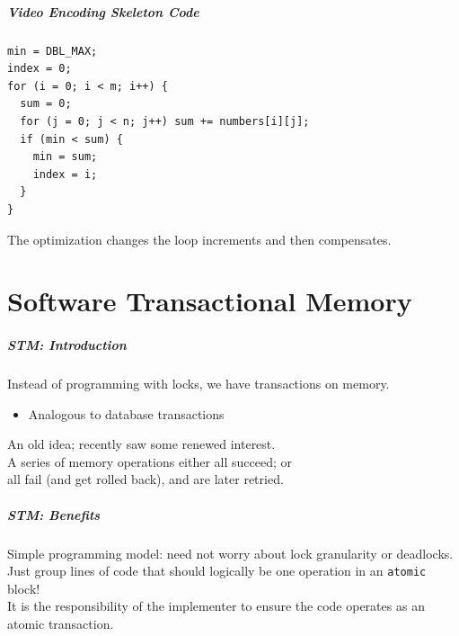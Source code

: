 \documentclass[aspectratio=43]{beamer}
\newenvironment{changemargin}[1]{%
  \begin{list}{}{%
    \setlength{\topsep}{0pt}%
    \setlength{\leftmargin}{#1}%
    \setlength{\rightmargin}{1em}
    \setlength{\listparindent}{\parindent}%
    \setlength{\itemindent}{\parindent}%
    \setlength{\parsep}{\parskip}%
  }%
  \item[]}{\end{list}}
\begin{document}

\begin{frame}[fragile]
  \frametitle{Video Encoding Skeleton Code}

\begin{changemargin}{2cm}
\begin{lstlisting}
min = DBL_MAX;
index = 0;
for (i = 0; i < m; i++) {
  sum = 0;
  for (j = 0; j < n; j++) sum += numbers[i][j];
  if (min < sum) {
    min = sum;
    index = i;
  }
}
\end{lstlisting}
The optimization changes the loop increments and then compensates. 
\end{changemargin}
\end{frame}


\part{Software Transactional Memory}
\frame{\partpage}

\begin{frame}
  \frametitle{STM: Introduction}

\begin{changemargin}{1cm}
    Instead of programming with locks, we have transactions on memory.
      \begin{itemize}
        \item Analogous to database transactions
      \end{itemize}
    An old idea; recently saw some renewed interest.\\[1em]

    A series of memory operations either all succeed; or \\ \qquad
     all fail (and get
      rolled back), and are later retried.
\end{changemargin}
\end{frame}

\begin{frame}
  \frametitle{STM: Benefits}

\begin{changemargin}{2cm}
    Simple programming model: need not worry about lock
      granularity or deadlocks.\\[1em]

    Just group lines of code that should logically be one operation
      in an {\tt atomic} block!\\[1em]

    It is the responsibility of the implementer to ensure the code
      operates as an atomic transaction.
\end{changemargin}
\end{frame}
\end{document}
